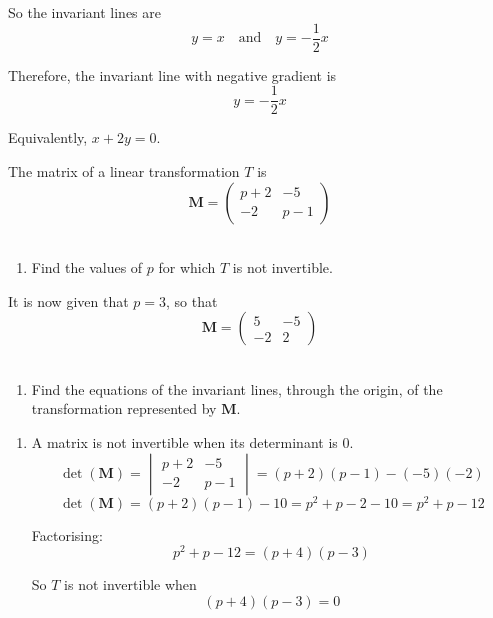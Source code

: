 \documentclass[leqno]{article}
\begin{document}
\begin{enumerate}[
  label=\textbf{\arabic*.},
  leftmargin=*,
  topsep=0pt,
  partopsep=0pt,
  parsep=0pt
]
\begin{djsSolution}
So the invariant lines are
\[
y=x
\quad \text{and} \quad
y=-\frac12x
\]

Therefore, the invariant line with negative gradient is
\[
y=-\frac12x
\]

Equivalently, \(x+2y=0\).
\end{djsSolution}


\newpage

\questionitem

The matrix of a linear transformation $T$ is
\[
\mathbf{M} = \begin{pmatrix} p+2 & -5 \\[6pt] -2 & p-1 \end{pmatrix}
\] \\
\begin{enumerate}[label=\textbf{(\alph*)}]
  \item Find the values of $p$ for which $T$ is not invertible.  \\
\end{enumerate}
It is now given that $p = 3$, so that
\[
\mathbf{M} = \begin{pmatrix} 5 & -5 \\ -2 & 2 \end{pmatrix}
\] \\
\begin{enumerate}[label=\textbf{(\alph*)}, resume]
  \item Find the equations of the invariant lines, through the origin, of the transformation represented by $\mathbf{M}$.  \\
\end{enumerate}

\vspace*{10pt}

\begin{djsSolution}
\begin{enumerate}[label=\textbf{(\alph*)}]
  \item A matrix is not invertible when its determinant is \(0\).
  \[
  \det(\mathbf{M})=
  \begin{vmatrix}
  p+2 & -5\\
  -2 & p-1
  \end{vmatrix}
  =(p+2)(p-1)-(-5)(-2)
  \]
  \[
  \det(\mathbf{M})=(p+2)(p-1)-10=p^2+p-2-10=p^2+p-12
  \]

  Factorising:
  \[
  p^2+p-12=(p+4)(p-3)
  \]

  So \(T\) is not invertible when
  \[
  (p+4)(p-3)=0
  \]


\end{enumerate}
\end{djsSolution}
\end{enumerate}
\end{document}
